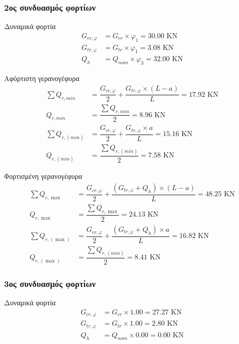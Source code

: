\subsubsection{2ος συνδυασμός φορτίων}
Δυναμικά  φορτία
\begin{align*}
G_{cr,φ}  &= G_{cr} \times φ_1    =  30.00 \text{ KN} \\
G_{tr,φ}  &= G_{tr} \times φ_1    =   3.08 \text{ KN} \\
Q_h       &= Q_{nom} \times φ_3   =  32.00   \text{ KN}
\end{align*}

Αφόρτιστη γερανογέφυρα
\begin{align*}
\sum{Q_{r,min}}   &= \dfrac{G_{cr,φ}}{2} + \dfrac{G_{tr,φ} \times (L - a)}{L} =  17.92 \text{ KN} \\
Q_{r,min}         &= \dfrac{\displaystyle\sum{Q_{r,min}}}{2}                  =   8.96  \text{ KN} \\
\sum{Q_{r,(min)}} &= \dfrac{G_{cr,φ}}{2} + \dfrac{G_{tr,φ} \times a}{L}       =  15.16 \text{ KN} \\
Q_{r,(min)}       &= \dfrac{\displaystyle\sum{Q_{r,(min)}}}{2}                =   7.58  \text{ KN}
\end{align*}

Φορτισμένη γερανογέφυρα
\begin{align*}
\sum{Q_{r,\max}}     &= \dfrac{G_{cr,φ}}{2} + \dfrac{(G_{tr,φ} + Q_h) \times (L - a)}{L}   =  48.25 \text{ KN} \\
Q_{r,\max}           &= \dfrac{\displaystyle\sum{Q_{r,\max}}}{2}                           =  24.13  \text{ KN} \\
\sum{Q_{r,(\max)}}   &= \dfrac{G_{cr,φ}}{2} + \dfrac{(G_{tr,φ} + Q_h) \times a}{L}         =  16.82 \text{ KN} \\
Q_{r,(\max)}         &= \dfrac{\displaystyle\sum{Q_{r,(min)}}}{2}                          =   8.41 \text{ KN}
\end{align*}

\subsubsection{3ος συνδυασμός φορτίων}
Δυναμικά  φορτία
\begin{align*}
G_{cr,φ}  &= G_{cr} \times 1.00    =  27.27 \text{ KN} \\
G_{tr,φ}  &= G_{tr} \times 1.00    =   2.80 \text{ KN} \\
Q_h       &= Q_{nom} \times 0.00   =   0.00   \text{ KN}
\end{align*}

